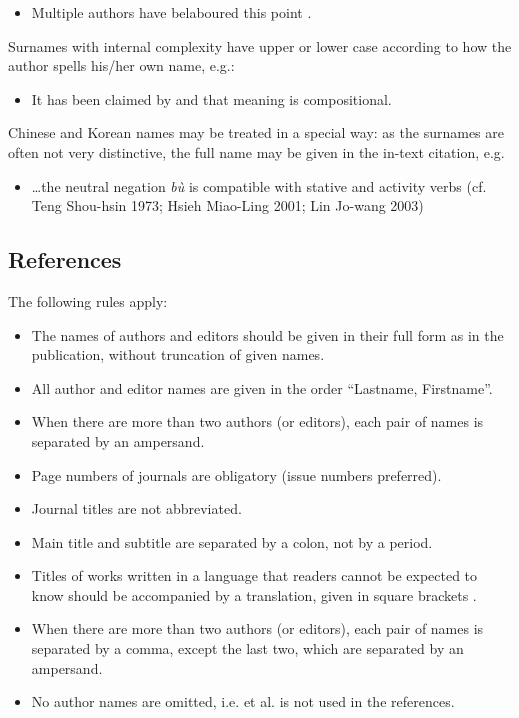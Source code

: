 \documentclass[charis,linguex]{glossa}
\begin{document}
\begin{itemize}
\item Multiple authors have belaboured this point \citep{chomsky:1981,chomsky:1986a,chomsky:1986,iverson:1989,casali:1998a,blevins:2004,franks:2005}.
\end{itemize}
Surnames with internal complexity have upper or lower case according to how the author spells his/her own name, e.g.:

\begin{itemize}
\item It has been claimed by \citet{swart:1998} and \citet{belder:2011} that meaning is compositional. 
\end{itemize}
Chinese and Korean names may be treated in a special way: as the surnames are often not very distinctive, the full name may be given in the in-text citation, e.g.

\begin{itemize}
\item  \ldots the neutral negation \textit{bù} is compatible with stative and activity verbs (cf. Teng Shou-hsin 1973; Hsieh Miao-Ling 2001; Lin Jo-wang 2003) %
\end{itemize}

\subsection{References}

The following rules apply:

\begin{itemize}
\item The names of authors and editors should be given in their full form as in the publication, without truncation of given names.
\item All author and editor names are given in the order ``Lastname, Firstname''.
\item When there are more than two authors (or editors), each pair of names is separated by an ampersand.
\item Page numbers of journals are obligatory (issue numbers preferred).
\item Journal titles are not abbreviated.
\item Main title and subtitle are separated by a colon, not by a period.
\item Titles of works written in a language that readers cannot be expected to know should be accompanied by a translation, given in square brackets \citep{Li1999}.
\item When there are more than two authors (or editors), each pair of names is separated by a comma, except the last two, which are separated by an ampersand. 
\item No author names are omitted, i.e. et al. is not used in the references.
\end{itemize}
\end{document}
